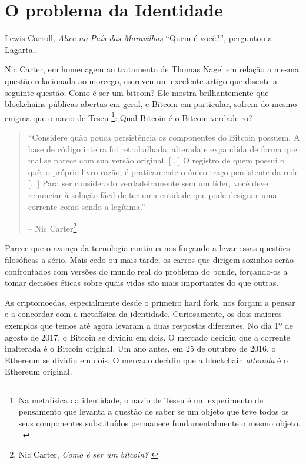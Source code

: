\chapter{O problema da Identidade}
\label{les:4}

\begin{chapquote}{Lewis Carroll, \textit{Alice no País das Maravilhas}}
  \enquote{Quem é você?}, perguntou a Lagarta..
\end{chapquote}

Nic Carter, em homenagem ao tratamento de Thomas Nagel em relação a mesma questão relacionada ao morcego, escreveu um excelente artigo que discute a seguinte questão: Como é ser um bitcoin? Ele mostra brilhantemente que blockchains públicas abertas em geral, e Bitcoin em particular, sofrem do mesmo enigma que o navio de Teseu \footnote{Na metafísica da identidade, o navio de Teseu é um experimento de pensamento que levanta a questão de saber se um objeto que teve todos os seus componentes substituídos permanece fundamentalmente o mesmo objeto. ~\cite{wiki:theseus}}: Qual Bitcoin é o Bitcoin verdadeiro?

\begin{quotation}\begin{samepage}
\enquote{Considere quão pouca persistência os componentes do Bitcoin possuem. A base de código inteira foi retrabalhada, alterada e expandida de forma que mal se parece com sua versão original. [...] O registro de quem possui o quê, o próprio livro-razão, é praticamente o único traço persistente da rede [...] Para ser considerado verdadeiramente sem um líder, você deve renunciar à solução fácil de ter uma entidade que pode designar uma corrente como sendo a legítima.}
\begin{flushright} -- Nic Carter\footnote{Nic Carter, \textit{Como é ser um bitcoin?} \cite{bitcoin-identity}}
\end{flushright}\end{samepage}\end{quotation}

Parece que o avanço da tecnologia continua nos forçando a levar essas questões filosóficas a sério. Mais cedo ou mais tarde, os carros que dirigem sozinhos serão confrontados com versões do mundo real do problema do bonde, forçando-os a tomar decisões éticas sobre quais vidas são mais importantes do que outras.

As criptomoedas, especialmente desde o primeiro hard fork, nos forçam a pensar e a concordar com a metafísica da identidade. Curiosamente, os dois maiores exemplos que temos até agora levaram a duas respostas diferentes. No dia 1º de agosto de 2017, o Bitcoin se dividiu em dois. O mercado decidiu que a corrente inalterada é o Bitcoin original. Um ano antes, em 25 de outubro de 2016, o Ethereum se dividiu em dois. O mercado decidiu que a blockchain \textit{alterada} é o Ethereum original.


